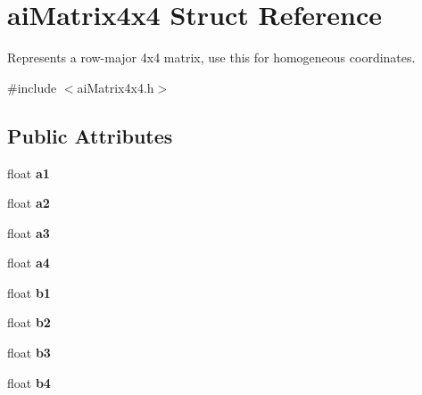 \hypertarget{structai_matrix4x4}{\section{ai\-Matrix4x4 Struct Reference}
\label{structai_matrix4x4}
}


Represents a row-\/major 4x4 matrix, use this for homogeneous coordinates.  




{\ttfamily \#include $<$ai\-Matrix4x4.\-h$>$}

\subsection*{Public Attributes}
\begin{DoxyCompactItemize}
\item 
\hypertarget{structai_matrix4x4_aeabb269b7ef332d3c69c14d8af3d531c}{float {\bfseries a1}}\label{structai_matrix4x4_aeabb269b7ef332d3c69c14d8af3d531c}

\item 
\hypertarget{structai_matrix4x4_a9d36d992ba3cfc814913e0225a04b91b}{float {\bfseries a2}}\label{structai_matrix4x4_a9d36d992ba3cfc814913e0225a04b91b}

\item 
\hypertarget{structai_matrix4x4_a36f0d69cf678c3b5deea5a76f5624848}{float {\bfseries a3}}\label{structai_matrix4x4_a36f0d69cf678c3b5deea5a76f5624848}

\item 
\hypertarget{structai_matrix4x4_a184e1a78f61c430aa7b0079b42e4c2a0}{float {\bfseries a4}}\label{structai_matrix4x4_a184e1a78f61c430aa7b0079b42e4c2a0}

\item 
\hypertarget{structai_matrix4x4_a59667637f4d71bf4ebc1183bebe746fb}{float {\bfseries b1}}\label{structai_matrix4x4_a59667637f4d71bf4ebc1183bebe746fb}

\item 
\hypertarget{structai_matrix4x4_af5dcecf706021b313239b7113cb80daa}{float {\bfseries b2}}\label{structai_matrix4x4_af5dcecf706021b313239b7113cb80daa}

\item 
\hypertarget{structai_matrix4x4_a0f0bf4dfcf9dd562d71d5ed5a5342316}{float {\bfseries b3}}\label{structai_matrix4x4_a0f0bf4dfcf9dd562d71d5ed5a5342316}

\item 
\hypertarget{structai_matrix4x4_ae57a4a8b8f4509f5bdf90d7856c59281}{float {\bfseries b4}}\label{structai_matrix4x4_ae57a4a8b8f4509f5bdf90d7856c59281}


\end{DoxyCompactItemize}
